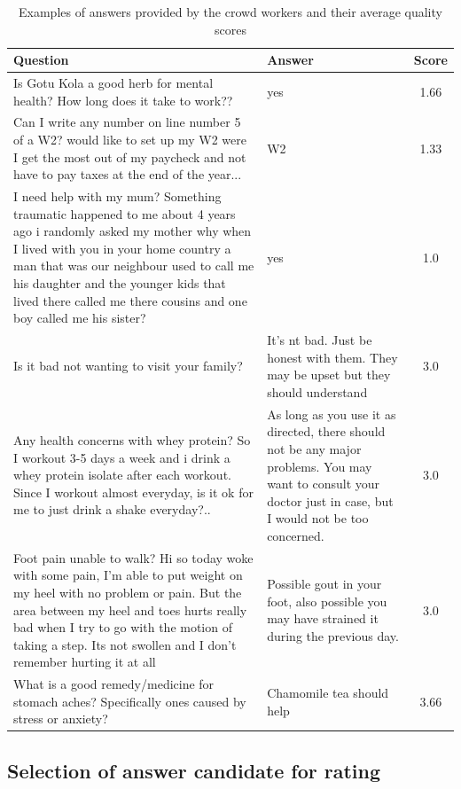 \begin{table}[ht]
\centering
\begin{tabular}{| p{10.5cm} | p{5cm} | c |}
\hline
Question & Answer & Score \\
\hline
 Is Gotu Kola a good herb for mental health? How long does it take to work?? & yes & 1.66\\
 \hline
Can I write any number on line number 5 of a W2?  would like to set up my W2 were I get the most out of my paycheck and not have to pay taxes at the end of the year... & W2 & 1.33\\
 \hline
I need help with my mum? Something traumatic happened to me about 4 years ago i randomly asked my mother why when I lived with you in your home country a man that was our neighbour used to call me his daughter and the younger kids that lived there called me there cousins and one boy called me his sister? & yes & 1.0\\
\hline
\hline
 Is it bad not wanting to visit your family? & It's nt bad. Just be honest with them. They may be upset but they should understand & 3.0 \\
 \hline
Any health concerns with whey protein? So I workout 3-5 days a week and i drink a whey protein isolate after each workout. Since I workout almost everyday, is it ok for me to just drink a shake everyday?.. & As long as you use it as directed, there should not be any major problems.  You may want to consult your doctor just in case, but I would not be too concerned. & 3.0\\
\hline
Foot pain unable to walk? Hi so today woke with some pain, I'm able to put weight on my heel with no problem or pain.  But  the area between my heel and toes hurts really bad when I try to go with the motion of taking a step. Its not swollen and I don't remember hurting it at all & Possible gout in your foot, also possible you may have strained it during the previous day. & 3.0\\
\hline
What is a good remedy/medicine for stomach aches? Specifically ones caused by stress or anxiety? & Chamomile tea should help & 3.66\\
\hline
\end{tabular}
\caption{Examples of answers provided by the crowd workers and their average quality scores}
\label{table:answer_examples}
\end{table}

\subsection{Selection of answer candidate for rating}
\label{sec:analysis:order}

